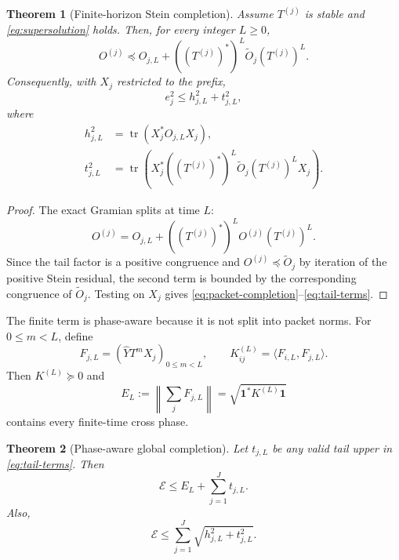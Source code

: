 \documentclass[11pt]{article}
\newtheorem{theorem}{Theorem}[section]
\theoremstyle{remark}
\newcommand{\norm}[1]{\left\lVert#1\right\rVert}
\newcommand{\cE}{\mathcal E}
\newcommand{\tr}{\operatorname{tr}}
\begin{document}
\begin{theorem}[Finite-horizon Stein completion]
\label{thm:completion}
Assume $T^{(j)}$ is stable and \eqref{eq:supersolution} holds.  Then, for
every integer $L\ge0$,
\begin{equation}
 \boxed{
 O^{(j)}\preceq O_{j,L}
 +((T^{(j)})^*)^L\widetilde O_j(T^{(j)})^L.}
 \label{eq:loewner-completion}
\end{equation}
Consequently, with $X_j$ restricted to the prefix,
\begin{equation}
 e_j^2\le h_{j,L}^2+t_{j,L}^2,
 \label{eq:packet-completion}
\end{equation}
where
\begin{align}
 h_{j,L}^2&=\tr(X_j^*O_{j,L}X_j),\\
 t_{j,L}^2&=\tr\!\left(X_j^*((T^{(j)})^*)^L
             \widetilde O_j(T^{(j)})^LX_j\right).
 \label{eq:tail-terms}
\end{align}
\end{theorem}

\begin{proof}
The exact Gramian splits at time $L$:
\[
 O^{(j)}=O_{j,L}+((T^{(j)})^*)^LO^{(j)}(T^{(j)})^L.
\]
Since the tail factor is a positive congruence and
$O^{(j)}\preceq\widetilde O_j$ by iteration of the positive Stein residual,
the second term is bounded by the corresponding congruence of
$\widetilde O_j$.  Testing on $X_j$ gives
\eqref{eq:packet-completion}--\eqref{eq:tail-terms}.
\end{proof}

The finite term is phase-aware because it is not split into packet norms.
For $0\le m<L$, define
\begin{equation}
 F_{j,L}=(\widehat YT^mX_j)_{0\le m<L},
 \qquad K^{(L)}_{ij}=\langle F_{i,L},F_{j,L}\rangle.
 \label{eq:finite-gram}
\end{equation}
Then $K^{(L)}\succeq0$ and
\begin{equation}
 E_L:=\norm{\sum_jF_{j,L}}=\sqrt{\mathbf1^*K^{(L)}\mathbf1}
 \label{eq:finite-fused}
\end{equation}
contains every finite-time cross phase.

\begin{theorem}[Phase-aware global completion]
\label{thm:global}
Let $t_{j,L}$ be any valid tail upper in
\eqref{eq:tail-terms}.  Then
\begin{equation}
 \boxed{\cE\le E_L+\sum_{j=1}^Jt_{j,L}.}
 \label{eq:global-completion}
\end{equation}
Also,
\begin{equation}
 \cE\le\sum_{j=1}^J\sqrt{h_{j,L}^2+t_{j,L}^2}.
 \label{eq:packet-global}
\end{equation}
\end{theorem}
\end{document}
